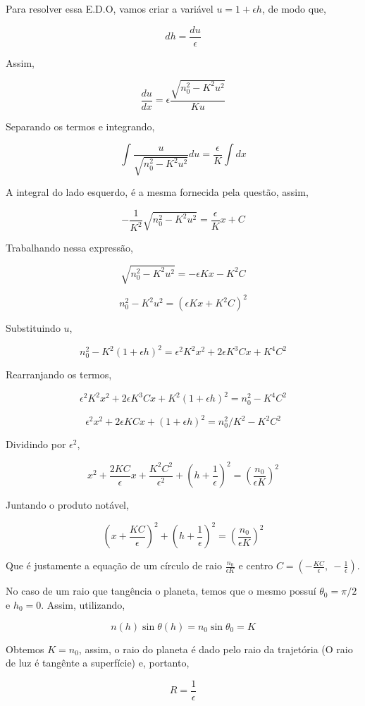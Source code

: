 \documentclass[11pt]{article}
\begin{document}
\begin{pproblem}
\begin{pssolution*}{}{}
\begin{alternativas}
        Para resolver essa E.D.O, vamos criar a variável \(u = 1+\epsilon h\), de modo que, 

        \[dh = \frac{du}{\epsilon}\]

        Assim, 

        \[\frac{du}{dx} = \epsilon\frac{\sqrt{n_0^2 - K^2u^2}}{Ku}\]

        Separando os termos e integrando, 

        \[\int \frac{u}{\sqrt{n_0^2 - K^2u^2}} du = \frac{\epsilon}{K}\int dx\]
    
        A integral do lado esquerdo, é a mesma fornecida pela questão, assim, 

        \[-\frac{1}{K^2}\sqrt{n_0^2-K^2u^2} = \frac{\epsilon}{K}x + C\]

        Trabalhando nessa expressão, 

        \[\sqrt{n_0^2-K^2u^2} = -\epsilon K x - K^2C\]

        \[n_0^2-K^2u^2 = (\epsilon K x + K^2C)^2\]

        Substituindo \(u\), 

        \[n_0^2-K^2(1+\epsilon h)^2 = \epsilon^2K^2x^2 + 2\epsilon K^3 C x + K^4C^2\]

        Rearranjando os termos, 

        \[\epsilon^2K^2x^2 + 2\epsilon K^3 C x + K^2(1+\epsilon h)^2 = n_0^2 - K^4C^2 \]

        \[\epsilon^2x^2 + 2\epsilon K C x + (1+\epsilon h)^2 = n_0^2/K^2 - K^2C^2 \]

        Dividindo por \(\epsilon^2\), 

        \[x^2 + \frac{2KC}{\epsilon}x + \frac{K^2C^2}{\epsilon^2} + \left(h+\frac{1}{\epsilon}\right)^2 = \left(\frac{n_0}{\epsilon K}\right)^2\]

        Juntando o produto notável, 

        \[\boxed{\left(x + \frac{KC}{\epsilon}\right)^2+\left(h+\frac{1}{\epsilon}\right)^2 = \left(\frac{n_0}{\epsilon K}\right)^2}\]
   
        Que é justamente a equação de um círculo de raio \(\frac{n_0}{\epsilon K}\) e centro \(C = (-\frac{KC}{\epsilon}, \ - \frac{1}{\epsilon})\).

        \item No caso de um raio que tangência o planeta, temos que o mesmo possuí \(\theta_0 = \pi/2\) e \(h_0=0\). Assim, utilizando, 
        
        \[n(h)\sin\theta(h) = n_0\sin\theta_0 = K\]

        Obtemos \(K = n_0\), assim, o raio do planeta é dado pelo raio da trajetória (O raio de luz é tangênte a superfície) e, portanto, 

        \[\boxed{R = \frac{1}{\epsilon}}\]
    \end{alternativas}
    
\end{pssolution*}
\end{pproblem}
\end{document}
